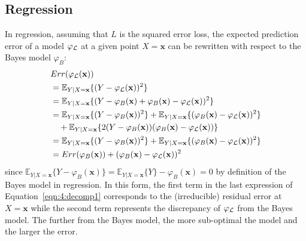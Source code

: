 \subsection{Regression}
\label{sec:bias-variance:regression}

In regression, assuming that $L$ is the squared error loss, the expected
prediction error of a model $\varphi_{\cal L}$ at a given point $X=\mathbf{x}$
can be rewritten with respect to the Bayes model $\varphi_B$:
\begin{align}
& Err(\varphi_{\cal L}(\mathbf{x})) \nonumber \\
&= \mathbb{E}_{Y|X=\mathbf{x}} \{ (Y - \varphi_{\cal L}(\mathbf{x}))^2 \} \nonumber \\
&= \mathbb{E}_{Y|X=\mathbf{x}} \{ (Y -\varphi_B(\mathbf{x}) + \varphi_B(\mathbf{x}) - \varphi_{\cal L}(\mathbf{x}))^2 \} \nonumber \\
&= \mathbb{E}_{Y|X=\mathbf{x}} \{ (Y -\varphi_B(\mathbf{x}))^2  \} + \mathbb{E}_{Y|X=\mathbf{x}} \{ (\varphi_B(\mathbf{x}) - \varphi_{\cal L}(\mathbf{x}))^2 \} \nonumber \\
& \quad+ \mathbb{E}_{Y|X=\mathbf{x}} \{ 2 (Y - \varphi_B(\mathbf{x}))(\varphi_B(\mathbf{x}) - \varphi_{\cal L}(\mathbf{x})) \} \nonumber \\
&= \mathbb{E}_{Y|X=\mathbf{x}} \{ (Y -\varphi_B(\mathbf{x}))^2 \} + \mathbb{E}_{Y|X=\mathbf{x}} \{ (\varphi_B(\mathbf{x}) - \varphi_{\cal L}(\mathbf{x}))^2 \} \nonumber \\
&= Err(\varphi_B(\mathbf{x})) +  (\varphi_B(\mathbf{x}) - \varphi_{\cal L}(\mathbf{x}))^2 \label{eqn:4:decomp1}
\end{align}
since $\mathbb{E}_{Y|X=\mathbf{x}} \{ Y - \varphi_B(\mathbf{x}) \} =
\mathbb{E}_{Y|X=\mathbf{x}} \{ Y \} - \varphi_B(\mathbf{x}) = 0$ by definition
of the Bayes model in regression. In this form, the first term in the last
expression of Equation~\ref{eqn:4:decomp1} corresponds to the (irreducible)
residual error  at $X=\mathbf{x}$ while the second term represents the
discrepancy of $\varphi_{\cal L}$ from the Bayes model. The further from the
Bayes model, the more sub-optimal the model and the larger the error.

